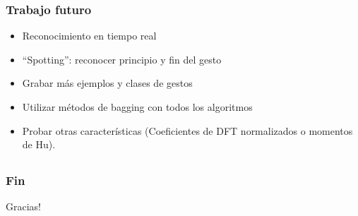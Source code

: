 \begin{myframe}
\frametitle{Trabajo futuro}
\begin{itemize}
\item Reconocimiento en tiempo real
\item “Spotting”: reconocer principio y fin del gesto
\item Grabar más ejemplos y clases de gestos
\item Utilizar métodos de bagging con todos los algoritmos
\item Probar otras características (Coeficientes de DFT normalizados o momentos de Hu).
\end{itemize}
\end{myframe}

\subsection{}
\begin{myframe}
\frametitle{Fin}
\begin{center}
{\Huge Gracias!}
\end{center}
\end{myframe}
